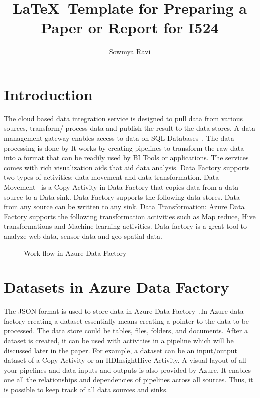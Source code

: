 \documentclass[9pt,twocolumn,twoside]{styles/osajnl}
\title{\LaTeX\ Template for Preparing a Paper or Report for I524}
\author[1]{Sowmya Ravi}
\affil[1]{School of Informatics and Computing, Bloomington, IN 47408, U.S.A.}
\affil[*]{Corresponding authors: laszewski@gmail.com}
\begin{document}
\maketitle

\section{Introduction}
The cloud based data integration service is designed to pull data from various sources, transform/ process data and publish the result to the data stores. A data management gateway enables access to data on SQL Databases~\cite{www-jamesserra}. The data processing is done by It works by creating pipelines to  transform the raw data into a format that can be readily used by BI Tools or applications. The services comes with rich visualization aids that aid data analysis. Data Factory supports two types of activities: data movement  and data transformation. Data Movement~\cite{www-microsoft-azure} is a Copy Activity in Data Factory that copies data from a data source to a Data sink. Data Factory supports the following data stores. Data from any source can be written to any sink.  Data Transformation:  Azure Data Factory supports the following transformation activities such as Map reduce, Hive transformations and Machine learning activities.
Data factory is a great tool to analyze web data, sensor data and geo-spatial data.	
\begin{figure}[htbp]
\centering
{}
\caption{Work flow in Azure Data Factory}
\label{fig:copy-local}
\end{figure}


\section{Datasets in Azure Data Factory}

The JSON format is used to store data in Azure Data Factory~\cite{www-microsoft-azure-data}.In Azure data factory creating a dataset essentially means creating a pointer to the data to be processed.
The data store could be tables, files, folders, and documents. After a dataset is created, it can be used with activities in a pipeline which will be discussed later in the paper. For example, a dataset can be an input/output dataset of a Copy Activity or an HDInsightHive Activity. A visual layout of all your pipelines and data inputs and outputs is also provided by Azure. It enables one all the relationships and dependencies of  pipelines across all sources. Thus, it is possible to keep track of all data sources and sinks.
\end{document}
